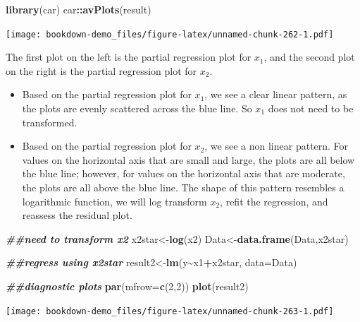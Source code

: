 \documentclass[
]{book}
\newenvironment{Shaded}{\begin{snugshade}}{\end{snugshade}}
\newcommand{\AttributeTok}[1]{\textcolor[rgb]{0.13,0.29,0.53}{#1}}
\newcommand{\DecValTok}[1]{\textcolor[rgb]{0.00,0.00,0.81}{#1}}
\newcommand{\DocumentationTok}[1]{\textcolor[rgb]{0.56,0.35,0.01}{\textbf{\textit{#1}}}}
\newcommand{\FunctionTok}[1]{\textcolor[rgb]{0.13,0.29,0.53}{\textbf{#1}}}
\newcommand{\NormalTok}[1]{#1}
\newcommand{\OtherTok}[1]{\textcolor[rgb]{0.56,0.35,0.01}{#1}}
\newcommand{\SpecialCharTok}[1]{\textcolor[rgb]{0.81,0.36,0.00}{\textbf{#1}}}
\providecommand{\tightlist}{%
  \setlength{\itemsep}{0pt}\setlength{\parskip}{0pt}}
\begin{document}
\begin{Shaded}
\begin{Highlighting}[]
\FunctionTok{library}\NormalTok{(car)}
\NormalTok{car}\SpecialCharTok{::}\FunctionTok{avPlots}\NormalTok{(result)}
\end{Highlighting}
\end{Shaded}

\texttt{[image: bookdown-demo\_files/figure-latex/unnamed-chunk-262-1.pdf]}

The first plot on the left is the partial regression plot for \(x_1\), and the second plot on the right is the partial regression plot for \(x_2\).

\begin{itemize}
\tightlist
\item
  Based on the partial regression plot for \(x_1\), we see a clear linear pattern, as the plots are evenly scattered across the blue line. So \(x_1\) does not need to be transformed.
\item
  Based on the partial regression plot for \(x_2\), we see a non linear pattern. For values on the horizontal axis that are small and large, the plots are all below the blue line; however, for values on the horizontal axis that are moderate, the plots are all above the blue line. The shape of this pattern resembles a logarithmic function, we will log transform \(x_2\), refit the regression, and reassess the residual plot.
\end{itemize}

\begin{Shaded}
\begin{Highlighting}[]
\DocumentationTok{\#\#need to transform x2}
\NormalTok{x2star}\OtherTok{\textless{}{-}}\FunctionTok{log}\NormalTok{(x2)}
\NormalTok{Data}\OtherTok{\textless{}{-}}\FunctionTok{data.frame}\NormalTok{(Data,x2star)}

\DocumentationTok{\#\#regress using x2star}
\NormalTok{result2}\OtherTok{\textless{}{-}}\FunctionTok{lm}\NormalTok{(y}\SpecialCharTok{\textasciitilde{}}\NormalTok{x1}\SpecialCharTok{+}\NormalTok{x2star, }\AttributeTok{data=}\NormalTok{Data)}

\DocumentationTok{\#\#diagnostic plots}
\FunctionTok{par}\NormalTok{(}\AttributeTok{mfrow=}\FunctionTok{c}\NormalTok{(}\DecValTok{2}\NormalTok{,}\DecValTok{2}\NormalTok{))}
\FunctionTok{plot}\NormalTok{(result2)}
\end{Highlighting}
\end{Shaded}

\texttt{[image: bookdown-demo\_files/figure-latex/unnamed-chunk-263-1.pdf]}
\end{document}
